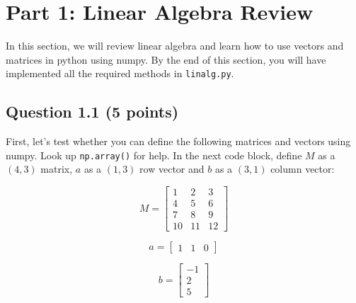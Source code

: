 \documentclass[11pt]{article}
\begin{document}
    \hypertarget{part-1-linear-algebra-review}{%
\section{Part 1: Linear Algebra
Review}\label{part-1-linear-algebra-review}}

In this section, we will review linear algebra and learn how to use
vectors and matrices in python using numpy. By the end of this section,
you will have implemented all the required methods in
\texttt{linalg.py}.

    \hypertarget{question-1.1-5-points}{%
\subsection{Question 1.1 (5 points)}\label{question-1.1-5-points}}

First, let's test whether you can define the following matrices and
vectors using numpy. Look up \texttt{np.array()} for help. In the next
code block, define \(M\) as a \((4, 3)\) matrix, \(a\) as a \((1, 3)\)
row vector and \(b\) as a \((3, 1)\) column vector:

\[M = \begin{bmatrix}
1 & 2 & 3 \\
4 & 5 & 6 \\
7 & 8 & 9 \\
10 & 11 & 12 \end{bmatrix}
\]

\[a = \begin{bmatrix}
1 & 1 & 0
\end{bmatrix}
\]

\[b = \begin{bmatrix}
-1 \\ 2 \\ 5
\end{bmatrix}  
\]
\end{document}
